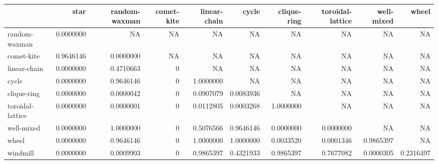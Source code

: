 \documentclass[
]{book}
\newenvironment{Shaded}{\begin{snugshade}}{\end{snugshade}}
\newcommand{\AttributeTok}[1]{\textcolor[rgb]{0.77,0.63,0.00}{#1}}
\newcommand{\ConstantTok}[1]{\textcolor[rgb]{0.00,0.00,0.00}{#1}}
\newcommand{\FunctionTok}[1]{\textcolor[rgb]{0.00,0.00,0.00}{#1}}
\newcommand{\NormalTok}[1]{#1}
\newcommand{\OtherTok}[1]{\textcolor[rgb]{0.56,0.35,0.01}{#1}}
\newcommand{\SpecialCharTok}[1]{\textcolor[rgb]{0.00,0.00,0.00}{#1}}
\newcommand{\StringTok}[1]{\textcolor[rgb]{0.31,0.60,0.02}{#1}}
\begin{document}
\begin{Shaded}
\end{Shaded}

\begin{table}
\centering
\begin{tabular}[t]{l|r|r|r|r|r|r|r|r|r}
\hline
  & star & random-waxman & comet-kite & linear-chain & cycle & clique-ring & toroidal-lattice & well-mixed & wheel\\
\hline
random-waxman & 0.0000000 & NA & NA & NA & NA & NA & NA & NA & NA\\
\hline
comet-kite & 0.9646146 & 0.0000000 & NA & NA & NA & NA & NA & NA & NA\\
\hline
linear-chain & 0.0000000 & 0.4710663 & 0 & NA & NA & NA & NA & NA & NA\\
\hline
cycle & 0.0000000 & 0.9646146 & 0 & 1.0000000 & NA & NA & NA & NA & NA\\
\hline
clique-ring & 0.0000000 & 0.0000042 & 0 & 0.0907079 & 0.0083936 & NA & NA & NA & NA\\
\hline
toroidal-lattice & 0.0000000 & 0.0000001 & 0 & 0.0112805 & 0.0003268 & 1.0000000 & NA & NA & NA\\
\hline
well-mixed & 0.0000000 & 1.0000000 & 0 & 0.5076566 & 0.9646146 & 0.0000000 & 0.0000000 & NA & NA\\
\hline
wheel & 0.0000000 & 0.9646146 & 0 & 1.0000000 & 1.0000000 & 0.0033520 & 0.0001346 & 0.9865397 & NA\\
\hline
windmill & 0.0000000 & 0.0009903 & 0 & 0.9865397 & 0.4321933 & 0.9865397 & 0.7677082 & 0.0000305 & 0.2316497\\
\hline
\end{tabular}
\end{table}
\end{document}
